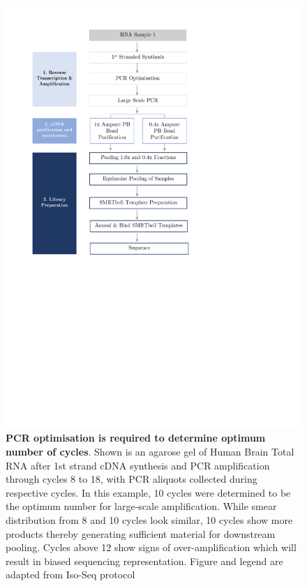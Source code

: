 \begin{figure}[htp]
	\begin{center}
		\includegraphics[page=13,trim={1cm 24cm 10cm 1cm},clip,scale = 0.9]{Figures/ProjectDevelopment_Figures.pdf}
	\end{center}
	\captionsetup{width=0.95\textwidth}
	\caption[Example of Agarose gel to determine optimum number of PCR cycles for amplification]%
	{\textbf{PCR optimisation is required to determine optimum number of cycles}. Shown is an agarose gel of Human Brain Total RNA after 1st strand cDNA synthesis and PCR amplification through cycles 8 to 18, with PCR aliquots collected during respective cycles. In this example, 10 cycles were determined to be the optimum number for large-scale amplification. While smear distribution from 8 and 10 cycles look similar, 10 cycles show more products thereby generating sufficient material for downstream pooling. Cycles above 12 show signs of over-amplification which will result in biased sequencing representation. Figure and legend are adapted from Iso-Seq protocol}
	\label{fig:pcr_optimisation_gel_eg}
\end{figure}


